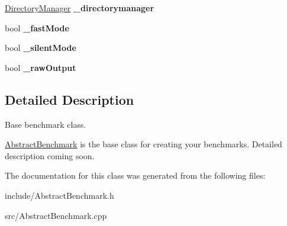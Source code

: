 \begin{DoxyCompactItemize}
\item 
\hypertarget{classAbstractBenchmark_a54e674ca4380a19085a10ac1cfb7867b}{\hyperlink{classDirectoryManager}{Directory\-Manager} {\bfseries \-\_\-directorymanager}}\label{classAbstractBenchmark_a54e674ca4380a19085a10ac1cfb7867b}

\item 
\hypertarget{classAbstractBenchmark_ac72c77058e89333a85d3eb03913fdc0c}{bool {\bfseries \-\_\-fast\-Mode}}\label{classAbstractBenchmark_ac72c77058e89333a85d3eb03913fdc0c}

\item 
\hypertarget{classAbstractBenchmark_a3816298f1e665d5ac7357b1c78d4df51}{bool {\bfseries \-\_\-silent\-Mode}}\label{classAbstractBenchmark_a3816298f1e665d5ac7357b1c78d4df51}

\item 
\hypertarget{classAbstractBenchmark_a38fe79d3c748d127986184ee0b7cdf1e}{bool {\bfseries \-\_\-raw\-Output}}\label{classAbstractBenchmark_a38fe79d3c748d127986184ee0b7cdf1e}

\end{DoxyCompactItemize}


\subsection{Detailed Description}
Base benchmark class. 

\hyperlink{classAbstractBenchmark}{Abstract\-Benchmark} is the base class for creating your benchmarks. Detailed description coming soon. 

The documentation for this class was generated from the following files\-:\begin{DoxyCompactItemize}
\item 
include/Abstract\-Benchmark.\-h\item 
src/Abstract\-Benchmark.\-cpp\end{DoxyCompactItemize}

